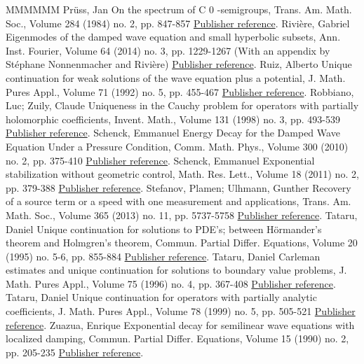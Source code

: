 \begin{thebibliography}{MMMMMM}
 Prüss, Jan On the spectrum of C 0 -semigroups, Trans. Am. Math. Soc., Volume 284 (1984) no. 2, pp. 847-857 \href{https://ahl.centre-mersenne.org/item/AHL_2020__3__1241_0/#Pruss}{Publisher reference}.
 Rivière, Gabriel Eigenmodes of the damped wave equation and small hyperbolic subsets, Ann. Inst. Fourier, Volume 64 (2014) no. 3, pp. 1229-1267 (With an appendix by Stéphane Nonnenmacher and Rivière) \href{https://ahl.centre-mersenne.org/item/AHL_2020__3__1241_0/#Riv}{Publisher reference}.
 Ruiz, Alberto Unique continuation for weak solutions of the wave equation plus a potential, J. Math. Pures Appl., Volume 71 (1992) no. 5, pp. 455-467 \href{https://ahl.centre-mersenne.org/item/AHL_2020__3__1241_0/#Ruiz}{Publisher reference}.
 Robbiano, Luc; Zuily, Claude Uniqueness in the Cauchy problem for operators with partially holomorphic coefficients, Invent. Math., Volume 131 (1998) no. 3, pp. 493-539 \href{https://ahl.centre-mersenne.org/item/AHL_2020__3__1241_0/#Rob-Zui}{Publisher reference}.
 Schenck, Emmanuel Energy Decay for the Damped Wave Equation Under a Pressure Condition, Comm. Math. Phys., Volume 300 (2010) no. 2, pp. 375-410 \href{https://ahl.centre-mersenne.org/item/AHL_2020__3__1241_0/#Schenckpressure}{Publisher reference}.
 Schenck, Emmanuel Exponential stabilization without geometric control, Math. Res. Lett., Volume 18 (2011) no. 2, pp. 379-388 \href{https://ahl.centre-mersenne.org/item/AHL_2020__3__1241_0/#Schenck}{Publisher reference}.
 Stefanov, Plamen; Ulhmann, Gunther Recovery of a source term or a speed with one measurement and applications, Trans. Am. Math. Soc., Volume 365 (2013) no. 11, pp. 5737-5758 \href{https://ahl.centre-mersenne.org/item/AHL_2020__3__1241_0/#Stefanov-Uhlmann}{Publisher reference}.
 Tataru, Daniel Unique continuation for solutions to PDE’s; between Hörmander’s theorem and Holmgren’s theorem, Commun. Partial Differ. Equations, Volume 20 (1995) no. 5-6, pp. 855-884 \href{https://ahl.centre-mersenne.org/item/AHL_2020__3__1241_0/#Tataru_uniq_analyticCPDE}{Publisher reference}.
 Tataru, Daniel Carleman estimates and unique continuation for solutions to boundary value problems, J. Math. Pures Appl., Volume 75 (1996) no. 4, pp. 367-408 \href{https://ahl.centre-mersenne.org/item/AHL_2020__3__1241_0/#Tataru}{Publisher reference}.
 Tataru, Daniel Unique continuation for operators with partially analytic coefficients, J. Math. Pures Appl., Volume 78 (1999) no. 5, pp. 505-521 \href{https://ahl.centre-mersenne.org/item/AHL_2020__3__1241_0/#Tataru_uniq_analyticJMPA}{Publisher reference}.
 Zuazua, Enrique Exponential decay for semilinear wave equations with localized damping, Commun. Partial Differ. Equations, Volume 15 (1990) no. 2, pp. 205-235 \href{https://ahl.centre-mersenne.org/item/AHL_2020__3__1241_0/#Zuazua}{Publisher reference}.
\end{thebibliography}
